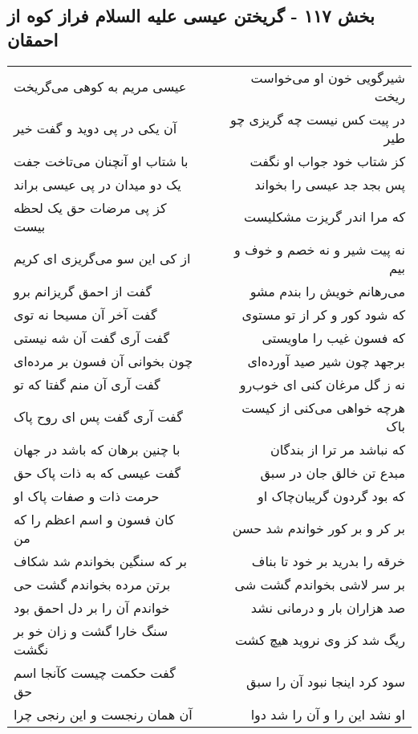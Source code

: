 \begin{center}
\section*{بخش ۱۱۷ - گریختن عیسی علیه السلام فراز کوه از احمقان}
\label{sec:sh117}
\begin{longtable}{l p{0.5cm} r}
عیسی مریم به کوهی می‌گریخت
&&
شیرگویی خون او می‌خواست ریخت
\\
آن یکی در پی دوید و گفت خیر
&&
در پیت کس نیست چه گریزی چو طیر
\\
با شتاب او آنچنان می‌تاخت جفت
&&
کز شتاب خود جواب او نگفت
\\
یک دو میدان در پی عیسی براند
&&
پس بجد جد عیسی را بخواند
\\
کز پی مرضات حق یک لحظه بیست
&&
که مرا اندر گریزت مشکلیست
\\
از کی این سو می‌گریزی ای کریم
&&
نه پیت شیر و نه خصم و خوف و بیم
\\
گفت از احمق گریزانم برو
&&
می‌رهانم خویش را بندم مشو
\\
گفت آخر آن مسیحا نه توی
&&
که شود کور و کر از تو مستوی
\\
گفت آری گفت آن شه نیستی
&&
که فسون غیب را ماویستی
\\
چون بخوانی آن فسون بر مرده‌ای
&&
برجهد چون شیر صید آورده‌ای
\\
گفت آری آن منم گفتا که تو
&&
نه ز گل مرغان کنی ای خوب‌رو
\\
گفت آری گفت پس ای روح پاک
&&
هرچه خواهی می‌کنی از کیست باک
\\
با چنین برهان که باشد در جهان
&&
که نباشد مر ترا از بندگان
\\
گفت عیسی که به ذات پاک حق
&&
مبدع تن خالق جان در سبق
\\
حرمت ذات و صفات پاک او
&&
که بود گردون گریبان‌چاک او
\\
کان فسون و اسم اعظم را که من
&&
بر کر و بر کور خواندم شد حسن
\\
بر که سنگین بخواندم شد شکاف
&&
خرقه را بدرید بر خود تا بناف
\\
برتن مرده بخواندم گشت حی
&&
بر سر لاشی بخواندم گشت شی
\\
خواندم آن را بر دل احمق بود
&&
صد هزاران بار و درمانی نشد
\\
سنگ خارا گشت و زان خو بر نگشت
&&
ریگ شد کز وی نروید هیچ کشت
\\
گفت حکمت چیست کآنجا اسم حق
&&
سود کرد اینجا نبود آن را سبق
\\
آن همان رنجست و این رنجی چرا
&&
او نشد این را و آن را شد دوا
\\

\end{longtable}
\end{center}
